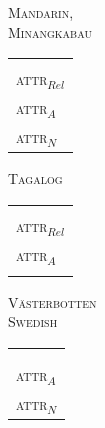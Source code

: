 \begin{figure} \label{multi abcd}
\parbox[b]{0.20\textwidth}{
\begin{center}\textsc{Mandarin},\\\textsc{Minangkabau}\\
\medskip
\begin{tabular}{| l |}
\hline
\\
\hline
\hline
\\
\hline
\textsc{attr}$_{Rel}$\\
\hline
\textsc{attr}$_{A}$\\
\hline
\textsc{attr}$_{N}$\\
\hline
\end{tabular}
\end{center}
}
\parbox[b]{0.20\textwidth}{
\begin{center}\textsc{Tagalog}\\
\bigskip
\begin{tabular}{| l |}
\hline
\\
\hline
\hline
\\
\hline
\textsc{attr}$_{Rel}$\\
\hline
\textsc{attr}$_{A}$\\
\hline
\\
\hline
\end{tabular}
\end{center}
}
\parbox[b]{0.20\textwidth}{
\begin{center}\textsc{Västerbotten }\\\textsc{Swedish}\\
\medskip
\begin{tabular}{| l |}
\hline
\\
\hline
\hline
\\
\hline
\\
\hline
\textsc{attr}$_{A}$\\
\hline
\textsc{attr}$_{N}$\\
\hline
\end{tabular}
\end{center}
}
\end{figure}
